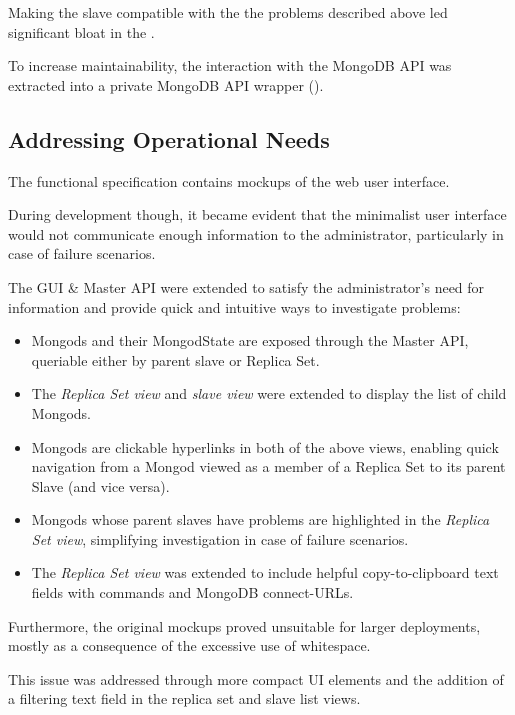 Making the slave compatible with the the problems described above led significant bloat in the .

To increase maintainability, the interaction with the MongoDB API was extracted into a private MongoDB API wrapper ().

\subsection{Addressing Operational Needs}\label{di:opneeds}

The functional specification contains mockups of the \mamid web user interface.

During development though, it became evident that the minimalist user interface would not communicate enough information
to the administrator, particularly in case of failure scenarios.

The GUI \& Master API were extended to satisfy the administrator's need for information and provide
quick and intuitive ways to investigate problems:

\begin{itemize}
  \item Mongods and their MongodState are exposed through the Master API, queriable either by parent slave or Replica Set.
  \item The \textit{Replica Set view} and \textit{slave view} were extended to display the list of child Mongods.
  \item Mongods are clickable hyperlinks in both of the above views, enabling quick navigation from a Mongod
          viewed as a member of a Replica Set to its parent Slave (and vice versa).
  \item Mongods whose parent slaves have problems are highlighted in the \textit{Replica Set view},
          simplifying investigation in case of failure scenarios.
  \item The \textit{Replica Set view} was extended to include helpful copy-to-clipboard text fields with commands and MongoDB connect-URLs.
\end{itemize}

Furthermore, the original mockups proved unsuitable for larger deployments, mostly as a consequence of the excessive use of whitespace.

This issue was addressed through more compact UI elements and the addition of a filtering text field in the replica set and slave list views.

